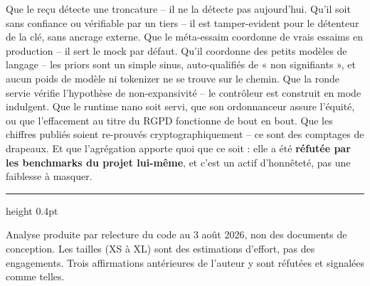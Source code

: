 \documentclass[10pt]{article}
\begin{document}
Que le reçu détecte une troncature -- il ne la détecte pas aujourd'hui. Qu'il soit sans confiance ou
vérifiable par un tiers -- il est tamper-evident pour le détenteur de la clé, sans ancrage externe. Que
le méta-essaim coordonne de vrais essaims en production -- il sert le mock par défaut. Qu'il coordonne
des petits modèles de langage -- les priors sont un simple sinus, auto-qualifiés de « non signifiants »,
et aucun poids de modèle ni tokenizer ne se trouve sur le chemin. Que la ronde servie vérifie
l'hypothèse de non-expansivité -- le contrôleur est construit en mode indulgent. Que le runtime nano
soit servi, que son ordonnanceur assure l'équité, ou que l'effacement au titre du RGPD fonctionne de
bout en bout. Que les chiffres publiés soient re-prouvés cryptographiquement -- ce sont des comptages de
drapeaux. Et que l'agrégation apporte quoi que ce soit : elle a été \textbf{réfutée par les benchmarks
du projet lui-même}, et c'est un actif d'honnêteté, pas une faiblesse à masquer.

\vspace{4pt}
{\color{grey}\hrule height 0.4pt}
\vspace{2pt}
{\footnotesize\color{grey}Analyse produite par relecture du code au 3 août 2026, non des documents de
conception. Les tailles (XS à XL) sont des estimations d'effort, pas des engagements. Trois
affirmations antérieures de l'auteur y sont réfutées et signalées comme telles.}
\end{document}
